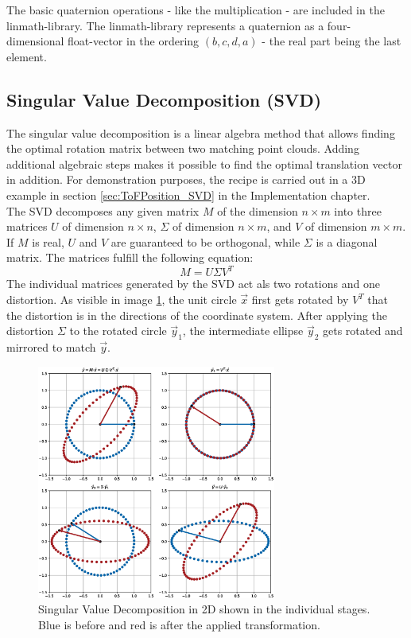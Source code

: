 The basic quaternion operations - like the multiplication - are included in the linmath-library. The linmath-library represents a quaternion as a four-dimensional float-vector in the ordering $(b, c, d, a)$ - the real part being the last element.\\
\subsection{Singular Value Decomposition (SVD)}
\label{sec:SVD}
The singular value decomposition is a linear algebra method that allows finding the optimal rotation matrix between two matching point clouds. Adding additional algebraic steps makes it possible to find the optimal translation vector in addition.\cite{SVD_ETH}
For demonstration purposes, the recipe is carried out in a 3D example in section \ref{sec:ToFPosition_SVD} in the Implementation chapter.\\
The SVD decomposes any given matrix $M$ of the dimension $n\times m$ into three matrices $U$ of dimension $n\times n$, $\Sigma$ of dimension $n\times m$, and $V$ of dimension $m\times m$.\cite{SVD_MIT} If $M$ is real, $U$ and $V$ are guaranteed to be orthogonal, while $\Sigma$ is a diagonal matrix. The matrices fulfill the following equation: 
\begin{equation*}
    M= U\Sigma V^{T}
\end{equation*}
The individual matrices generated by the SVD act als two rotations and one distortion. As visible in image \ref{im:SVD}, the unit circle $\vec{x}$ first gets rotated by $V^{T}$ that the distortion is in the directions of the coordinate system. After applying the distortion $\Sigma$ to the rotated circle $\vec{y}_{1}$, the intermediate ellipse $\vec{y}_{2}$ gets rotated and mirrored to match $\vec{y}$.
\begin{figure}[h]
    \centering
    \includegraphics[width=0.7\textwidth]{images/SVD}
    \caption{Singular Value Decomposition in 2D shown in the individual stages. Blue is before and red is after the applied transformation.}
    \label{im:SVD}
\end{figure}
